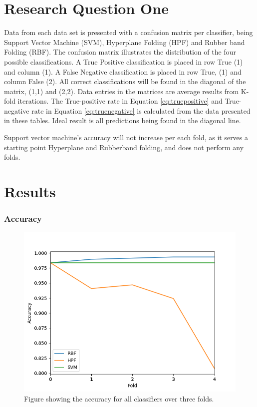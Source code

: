 \documentclass[a4paper,twoside]{bth}
\begin{document}
\section{Research Question One}

Data from each data set is presented with a confusion matrix per classifier, being Support Vector Machine (SVM), Hyperplane Folding (HPF) and Rubber band Folding (RBF). The confusion matrix illustrates the distribution of the four possible classifications. A True Positive classification is placed in row True (1) and column (1). A False Negative classification is placed in row True, (1) and column False (2). All correct classifications will be found in the diagonal of the matrix, (1,1) and (2,2). Data entries in the matrices are average results from K-fold iterations. The True-positive rate in Equation \ref{eq:truepositive} and True-negative rate in Equation \ref{eq:truenegative} is calculated from the data presented in these tables. Ideal result is all predictions being found in the diagonal line. \par
Support vector machine's accuracy will not increase per each fold, as it serves a starting point Hyperplane and Rubberband folding, and does not perform any folds.

\clearpage
\FloatBarrier

\section{Results}
\FloatBarrier
\subsubsection{Accuracy}



\begin{figure}[!htb]
\centering
\includegraphics[scale=0.7]{images/result-bmi/Accuracy.png}
   \caption{Figure showing the accuracy for all classifiers over three folds.}
   \label{fig:bmi-accuracy}
\end{figure}
\end{document}
